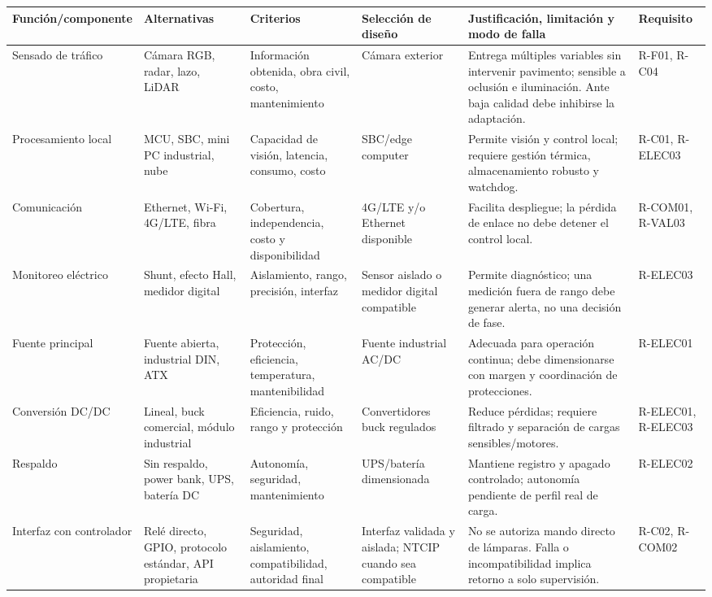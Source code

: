 \documentclass[12pt,a4paper,oneside]{report}
\begin{document}
\begin{landscape}
\footnotesize
{}
\label{tbl:seleccion-electronica-v2}
\begin{longtable}{@{}p{3.1cm}p{4.2cm}p{4.1cm}p{3.4cm}p{5.2cm}p{3.0cm}@{}}
\toprule
\textbf{Función/componente} & \textbf{Alternativas} & \textbf{Criterios} & \textbf{Selección de diseño} & \textbf{Justificación, limitación y modo de falla} & \textbf{Requisito}\\
\midrule
\endhead
Sensado de tráfico & Cámara RGB, radar, lazo, LiDAR & Información obtenida, obra civil, costo, mantenimiento & Cámara exterior & Entrega múltiples variables sin intervenir pavimento; sensible a oclusión e iluminación. Ante baja calidad debe inhibirse la adaptación. & R-F01, R-C04\\
Procesamiento local & MCU, SBC, mini PC industrial, nube & Capacidad de visión, latencia, consumo, costo & SBC/edge computer & Permite visión y control local; requiere gestión térmica, almacenamiento robusto y watchdog. & R-C01, R-ELEC03\\
Comunicación & Ethernet, Wi-Fi, 4G/LTE, fibra & Cobertura, independencia, costo y disponibilidad & 4G/LTE y/o Ethernet disponible & Facilita despliegue; la pérdida de enlace no debe detener el control local. & R-COM01, R-VAL03\\
Monitoreo eléctrico & Shunt, efecto Hall, medidor digital & Aislamiento, rango, precisión, interfaz & Sensor aislado o medidor digital compatible & Permite diagnóstico; una medición fuera de rango debe generar alerta, no una decisión de fase. & R-ELEC03\\
Fuente principal & Fuente abierta, industrial DIN, ATX & Protección, eficiencia, temperatura, mantenibilidad & Fuente industrial AC/DC & Adecuada para operación continua; debe dimensionarse con margen y coordinación de protecciones. & R-ELEC01\\
Conversión DC/DC & Lineal, buck comercial, módulo industrial & Eficiencia, ruido, rango y protección & Convertidores buck regulados & Reduce pérdidas; requiere filtrado y separación de cargas sensibles/motores. & R-ELEC01, R-ELEC03\\
Respaldo & Sin respaldo, power bank, UPS, batería DC & Autonomía, seguridad, mantenimiento & UPS/batería dimensionada & Mantiene registro y apagado controlado; autonomía pendiente de perfil real de carga. & R-ELEC02\\
Interfaz con controlador & Relé directo, GPIO, protocolo estándar, API propietaria & Seguridad, aislamiento, compatibilidad, autoridad final & Interfaz validada y aislada; NTCIP cuando sea compatible & No se autoriza mando directo de lámparas. Falla o incompatibilidad implica retorno a solo supervisión. & R-C02, R-COM02\\
\bottomrule
\end{longtable}
\end{landscape}
\end{document}
